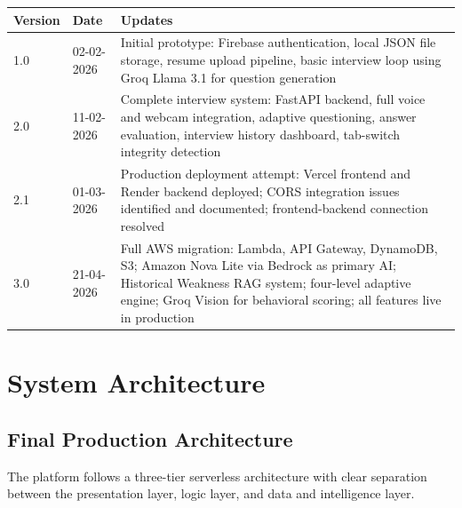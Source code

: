 \documentclass[12pt,a4paper]{article}
\begin{document}
\begin{longtable}{|p{2cm}|p{2.5cm}|p{9cm}|}
\hline
\textbf{Version} & \textbf{Date} & \textbf{Updates} \\
\hline
1.0 & 02-02-2026 & Initial prototype: Firebase authentication, local JSON file storage, resume upload pipeline, basic interview loop using Groq Llama 3.1 for question generation \\
\hline
2.0 & 11-02-2026 & Complete interview system: FastAPI backend, full voice and webcam integration, adaptive questioning, answer evaluation, interview history dashboard, tab-switch integrity detection \\
\hline
2.1 & 01-03-2026 & Production deployment attempt: Vercel frontend and Render backend deployed; CORS integration issues identified and documented; frontend-backend connection resolved \\
\hline
3.0 & 21-04-2026 & Full AWS migration: Lambda, API Gateway, DynamoDB, S3; Amazon Nova Lite via Bedrock as primary AI; Historical Weakness RAG system; four-level adaptive engine; Groq Vision for behavioral scoring; all features live in production \\
\hline
\end{longtable}


\newpage

\section{System Architecture}

\subsection{Final Production Architecture}

The platform follows a three-tier serverless architecture with clear separation between the presentation layer, logic layer, and data and intelligence layer.
\end{document}
